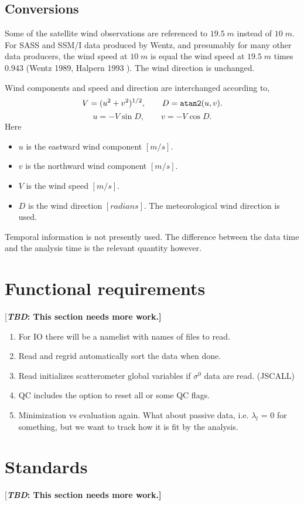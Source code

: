 \documentclass[11pt]{article}
\newcommand{\computer}[1]{{\tt #1}}
\newcommand{\gl}[1]{\mbox{$ \lambda_{#1} $}}
\newcommand{\mks}[2]{\mbox{$ {#1} \; {#2} $}}
\newcommand{\s}[1]{\mbox{$ \sigma^{#1} $}}
\newcommand{\xx}[1]{\section {#1}}
\newcommand{\xxx}[1]{\subsection {#1}}
\newcommand{\TBD}[1]{{[\bfseries{\itshape{TBD: }{{#1}}}]}}
\newcommand{\reference}[2]{(#1 \cite{#2})}
\newcommand{\eql}[2]{\begin{equation} \label{eq:#1} #2 \end{equation}}
\newcommand{\COMMENT}[2]{{[\bfseries {\itshape #1}: {#2}]}}
\renewcommand{\TBD}[1]{\COMMENT{TBD}{{#1}}}
\newcommand{\vardef}[3]{\item $ {#1} $ is the {#2} $ [{#3}] $. }
\begin{document}
\xxx {Conversions}

Some of the satellite wind observations are referenced to
\mks{19.5}{m} instead of \mks{10}{m}.  For SASS and SSM/I data
produced by Wentz, and presumably for many other data producers, the
wind speed at \mks{10}{m} is equal the wind speed at \mks{19.5}{m}
times 0.943 \reference{Wentz 1989, Halpern 1993}{Wen89,Hal93}.  The
wind direction is unchanged.

Wind components and speed and direction are interchanged according to,
 \eql{uv2VD}{ V = (u^2 + v^2)^{1/2}, \qquad 
              D = \mbox{\computer{atan2}}(u,v). }
 \eql{VD2uv}{ u = -V \sin D, \qquad v = -V \cos D . }
 Here \begin{itemize}
  \vardef{u}{eastward wind component}{m/s}
  \vardef{v}{northward wind component}{m/s}
  \vardef{V}{wind speed}{m/s}
  \vardef{D}{wind direction}{radians}
   The meteorological wind direction is used.
 \end{itemize} 

Temporal information is not presently used.  The difference between
the data time and the analysis time is the relevant quantity however.

\xx {Functional requirements}

\TBD{This section needs more work.}

\begin{enumerate}

\item For IO there will be a namelist with names of files to read.

\item Read and regrid automatically sort the data when done.

\item Read initializes scatterometer global variables if \s0 data are
read. (JSCALL)

\item QC includes the option to reset all or some QC flags.

\item Minimization vs evaluation again.  What about passive data,
i.e. \gl{l} = 0 for something, but we want to track how it is fit by
the analysis.

\end{enumerate}

\xx {Standards}

\TBD{This section needs more work.}
\end{document}
